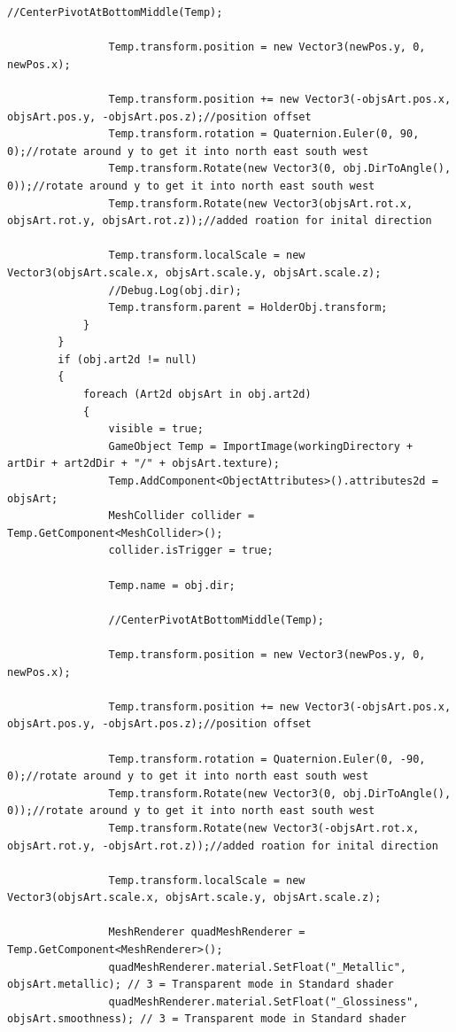 \begin{lstlisting}[language={[Sharp]C}, caption=C\# code for correct placement of object art from file to scene, label=clst:objCreate]
                //CenterPivotAtBottomMiddle(Temp);

                Temp.transform.position = new Vector3(newPos.y, 0, newPos.x);

                Temp.transform.position += new Vector3(-objsArt.pos.x, objsArt.pos.y, -objsArt.pos.z);//position offset
                Temp.transform.rotation = Quaternion.Euler(0, 90, 0);//rotate around y to get it into north east south west
                Temp.transform.Rotate(new Vector3(0, obj.DirToAngle(), 0));//rotate around y to get it into north east south west
                Temp.transform.Rotate(new Vector3(objsArt.rot.x, objsArt.rot.y, objsArt.rot.z));//added roation for inital direction

                Temp.transform.localScale = new Vector3(objsArt.scale.x, objsArt.scale.y, objsArt.scale.z);
                //Debug.Log(obj.dir);
                Temp.transform.parent = HolderObj.transform;
            }
        }
        if (obj.art2d != null)
        {
            foreach (Art2d objsArt in obj.art2d)
            {
                visible = true;
                GameObject Temp = ImportImage(workingDirectory + artDir + art2dDir + "/" + objsArt.texture);
                Temp.AddComponent<ObjectAttributes>().attributes2d = objsArt;
                MeshCollider collider = Temp.GetComponent<MeshCollider>();
                collider.isTrigger = true;

                Temp.name = obj.dir;

                //CenterPivotAtBottomMiddle(Temp);

                Temp.transform.position = new Vector3(newPos.y, 0, newPos.x);

                Temp.transform.position += new Vector3(-objsArt.pos.x, objsArt.pos.y, -objsArt.pos.z);//position offset

                Temp.transform.rotation = Quaternion.Euler(0, -90, 0);//rotate around y to get it into north east south west
                Temp.transform.Rotate(new Vector3(0, obj.DirToAngle(), 0));//rotate around y to get it into north east south west
                Temp.transform.Rotate(new Vector3(-objsArt.rot.x, objsArt.rot.y, -objsArt.rot.z));//added roation for inital direction

                Temp.transform.localScale = new Vector3(objsArt.scale.x, objsArt.scale.y, objsArt.scale.z);

                MeshRenderer quadMeshRenderer = Temp.GetComponent<MeshRenderer>();
                quadMeshRenderer.material.SetFloat("_Metallic", objsArt.metallic); // 3 = Transparent mode in Standard shader
                quadMeshRenderer.material.SetFloat("_Glossiness", objsArt.smoothness); // 3 = Transparent mode in Standard shader



\end{lstlisting}
